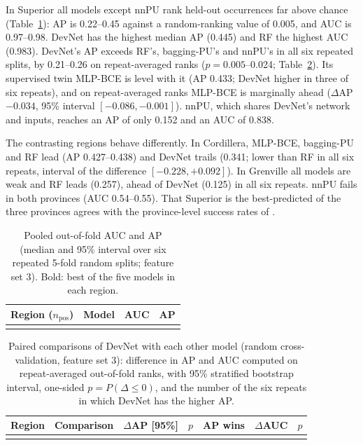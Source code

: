 \documentclass[pdflatex,sn-apa]{sn-jnl}
\begin{document}
In Superior all models except nnPU rank held-out occurrences far above chance (Table~\ref{tab:benchmark}): AP is 0.22--0.45 against a random-ranking value of 0.005, and AUC is 0.97--0.98. DevNet has the highest median AP (0.445) and RF the highest AUC (0.983). DevNet's AP exceeds RF's, bagging-PU's and nnPU's in all six repeated splits, by 0.21--0.26 on repeat-averaged ranks ($p = 0.005$--0.024; Table~\ref{tab:bootstrap}). Its supervised twin MLP-BCE is level with it (AP 0.433; DevNet higher in three of six repeats), and on repeat-averaged ranks MLP-BCE is marginally ahead ($\Delta$AP $-0.034$, 95\% interval $[-0.086, -0.001]$). nnPU, which shares DevNet's network and inputs, reaches an AP of only 0.152 and an AUC of 0.838.

The contrasting regions behave differently. In Cordillera, MLP-BCE, bagging-PU and RF lead (AP 0.427--0.438) and DevNet trails (0.341; lower than RF in all six repeats, interval of the difference $[-0.228, +0.092]$). In Grenville all models are weak and RF leads (0.257), ahead of DevNet (0.125) in all six repeats. nnPU fails in both provinces (AUC 0.54--0.55). That Superior is the best-predicted of the three provinces agrees with the province-level success rates of \citet{Parsa2024}.

\begin{table}[t]
\caption{Pooled out-of-fold AUC and AP (median and 95\% interval over six repeated 5-fold random splits; feature set 3). Bold: best of the five models in each region.}\label{tab:benchmark}
\footnotesize
\begin{tabular*}{\textwidth}{@{\extracolsep\fill}llcc}
\toprule
Region ($n_{\mathrm{pos}}$) & Model & AUC & AP \\
\midrule
\botrule
\end{tabular*}
\end{table}

\begin{table}[t]
\caption{Paired comparisons of DevNet with each other model (random cross-validation, feature set 3): difference in AP and AUC computed on repeat-averaged out-of-fold ranks, with 95\% stratified bootstrap interval, one-sided $p = P(\Delta \leq 0)$, and the number of the six repeats in which DevNet has the higher AP.}\label{tab:bootstrap}
\footnotesize
\setlength{\tabcolsep}{2.5pt}
\begin{tabular*}{\textwidth}{@{\extracolsep\fill}llccccc}
\toprule
Region & Comparison & $\Delta$AP [95\%] & $p$ & AP wins & $\Delta$AUC & $p$ \\
\midrule
\botrule
\end{tabular*}
\end{table}
\end{document}
